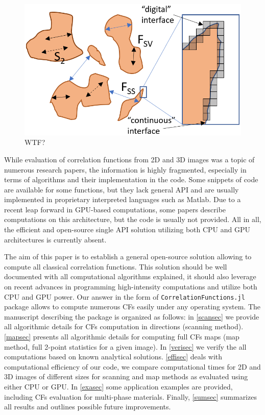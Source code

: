 \documentclass[reprint,amsmath,amssymb,aps,pre,showkeys,showpacs,nofootinbib]{revtex4-1}
\newcommand{\code}[1]{\colorbox{light-gray}{\texttt{#1}}}
\begin{document}
\begin{figure}[ht]
  \centering
  \includegraphics[width=0.9\linewidth]{images/corr.png}
  \caption[]{WTF?}
  \label{fig:functions}
\end{figure}

While evaluation of correlation functions from 2D and 3D images was a topic of
numerous research papers, the information is highly fragmented, especially in
terms of algorithms and their implementation in the code. Some snippets of code
are available for some functions, but they lack general API and are usually
implemented in proprietary interpreted languages such as Matlab. Due to a recent
leap forward in GPU-based computations, some papers describe computations on
this architecture, but the code is usually not provided. All in all, the
efficient and open-source single API solution utilizing both CPU and GPU
architectures is currently absent.

The aim of this paper is to establish a general open-source solution allowing to
compute all classical correlation functions. This solution should be well
documented with all computational algorithms explained, it should also leverage
on recent advances in programming high-intensity computations and utilize both
CPU and GPU power. Our answer in the form of \code{CorrelationFunctions.jl}
package allows to compute numerous CFs easily under any operating system. The
manuscript describing the package is organized as follows: in \cref{scansec} we
provide all algorithmic details for CFs computation in directions (scanning
method). \cref{mapsec} presents all algorithmic details for computing full CFs
maps (map method, full 2-point statistics for a given image). In \cref{verisec}
we verify the all computations based on known analytical
solutions. \cref{effisec} deals with computational efficiency of our code, we
compare computational times for 2D and 3D images of different sizes for scanning
and map methods as evaluated using either CPU or GPU. In \cref{exasec} some
application examples are provided, including CFs evaluation for multi-phase
materials. Finally, \cref{sumsec} summarizes all results and outlines possible
future improvements.
\end{document}
